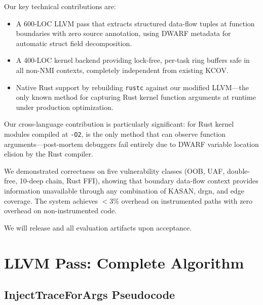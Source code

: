 \documentclass{ndss}
\begin{document}
Our key technical contributions are:
\begin{itemize}[nosep]
  \item A 600-LOC LLVM pass that extracts structured data-flow tuples at
        function boundaries with zero source annotation, using DWARF metadata
        for automatic struct field decomposition.
  \item A 400-LOC kernel backend providing lock-free, per-task ring buffers
        safe in all non-NMI contexts, completely independent from existing KCOV.
  \item Native Rust support by rebuilding \texttt{rustc} against our modified
        LLVM---the only known method for capturing Rust kernel function
        arguments at runtime under production optimization.
\end{itemize}

Our cross-language contribution is particularly significant: for Rust kernel
modules compiled at \texttt{-O2}, \toolname{} is the only method that can
observe function arguments---post-mortem debuggers fail entirely due to DWARF
variable location elision by the Rust compiler.

We demonstrated correctness on five vulnerability classes (OOB, UAF,
double-free, 10-deep chain, Rust FFI), showing that boundary data-flow context
provides information unavailable through any combination of KASAN, drgn, and
edge coverage. The system achieves $<$3\% overhead on instrumented paths with
zero overhead on non-instrumented code.

We will release \toolname{} and all evaluation artifacts upon acceptance.




\appendix

\section{LLVM Pass: Complete Algorithm}\label{app:pass}

\subsection{InjectTraceForArgs Pseudocode}
\end{document}
